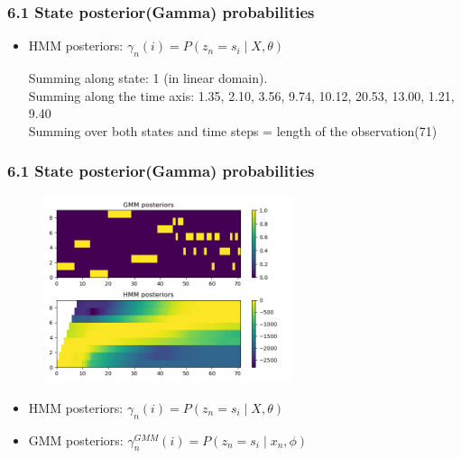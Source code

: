 \documentclass[t]{beamer}
\begin{document}
\begin{frame}
	\frametitle{6.1 State posterior(Gamma) probabilities}
	\begin{itemize}
		\item HMM posteriors: $\gamma_n(i) = P(z_n = s_i \mid X, \theta)$
		
		Summing along state: 1 (in linear domain).\\

		Summing along the time axis: 1.35, 2.10, 3.56, 9.74, 10.12, 20.53, 13.00, 1.21, 9.40\\
		
		Summing over both states and time steps = length of the observation(71)

	\end{itemize}

\end{frame}
	
\begin{frame}
\frametitle{6.1 State posterior(Gamma) probabilities}
	\begin{figure}
		\centering
		\includegraphics[width=0.65\textwidth]{figures/61.png}
	\end{figure}
	\begin{itemize}
		\item HMM posteriors: $\gamma_n(i) = P(z_n = s_i \mid X, \theta)$
		\item GMM posteriors: $\gamma_n^{GMM}(i) = P(z_n = s_i \mid x_n, \phi)$
	\end{itemize}


\end{frame}
\end{document}
